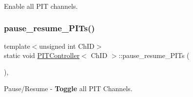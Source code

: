 Enable all P\+IT channels. 

\mbox{\label{group__PIT__Glb_ga24b7ea02555967ef945ab87aae338574}} 
\subsubsection{\texorpdfstring{pause\+\_\+resume\+\_\+\+P\+I\+Ts()}{pause\_resume\_PITs()}}
{\footnotesize\ttfamily template$<$unsigned int Ch\+ID$>$ \\
static void \hyperlink{classPITController}{P\+I\+T\+Controller}$<$ Ch\+ID $>$\+::pause\+\_\+resume\+\_\+\+P\+I\+Ts (\begin{DoxyParamCaption}{ }\end{DoxyParamCaption})\hspace{0.3cm}{\ttfamily [inline]}, {\ttfamily [static]}}



Pause/\+Resume -\/ {\bfseries Toggle} all P\+IT Channels. 

